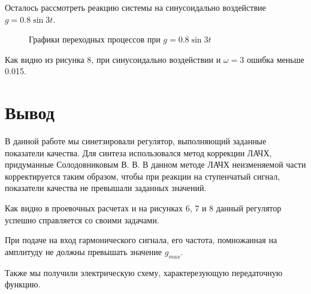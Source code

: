 \documentclass[a4paper, 12pt]{article}
\begin{document}
Осталось рассмотреть реакцию системы на синусоидально воздействие $g = 0.8\sin{3t}$.
\begin{figure}[h!]
    \begin{subfigure} {0.5\textwidth}
    \end{subfigure}
    \begin{subfigure} {0.5\textwidth}
    \end{subfigure}
    \caption{Графики переходных процессов при $g = 0.8\sin{3t}$}
\end{figure}
Как видно из рисунка 8, при синусоидально воздействии и $\omega = 3$ ошибка меньше 0.015.

\newpage
\section*{Вывод}
В данной работе мы синетзировали регулятор, выполняющий заданные показатели качества. Для синтеза использовался метод коррекции ЛАЧХ, придуманные Солодовниковым В. В. В данном методе ЛАЧХ неизменяемой части корректируется таким образом, чтобы при реакции на ступенчатый сигнал, показатели качества не превышали заданных значений. \par
Как видно в проевочных расчетах и на рисунках 6, 7 и 8 данный регулятор успешно справляется со своими задачами. \par
При подаче на вход гармонического сигнала, его частота, помножанная на амплитуду не должны превышать значение $g_{max}$. \par
Также мы получили электрическую схему, характерезующую передаточную функцию.
\end{document}
